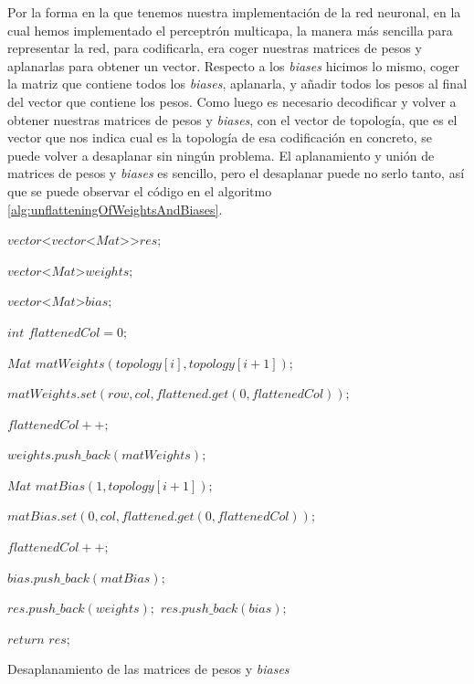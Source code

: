 Por la forma en la que tenemos nuestra implementación de la red neuronal, en la cual hemos implementado el perceptrón multicapa, la manera más sencilla para representar la red, para codificarla, era coger nuestras matrices de pesos y aplanarlas para obtener un vector. Respecto a los \textit{biases} hicimos lo mismo, coger la matriz que contiene todos los \textit{biases}, aplanarla, y añadir todos los pesos al final del vector que contiene los pesos. Como luego es necesario decodificar y volver a obtener nuestras matrices de pesos y \textit{biases}, con el vector de topología, que es el vector que nos indica cual es la topología de esa codificación en concreto, se puede volver a desaplanar sin ningún problema. El aplanamiento y unión de matrices de pesos y \textit{biases} es sencillo, pero el desaplanar puede no serlo tanto, así que se puede observar el código en el algoritmo \ref{alg:unflatteningOfWeightsAndBiases}.

\vspace{2mm}
\begin{algorithm}[H]
    $vector$\textless $vector$\textless $Mat$\textgreater\textgreater $res;$
    
    $vector$\textless $Mat$\textgreater $weights;$
    
    $vector$\textless $Mat$\textgreater $bias;$
    
    $int$ $flattenedCol = 0;$
    
    {
        $Mat$ $matWeights(topology[i], topology[i + 1]);$

        {
            {
                $matWeights.set(row, col, flattened.get(0, flattenedCol));$

                $flattenedCol++;$
            }
        }

        $weights.push\_back(matWeights);$
    }
    {
        $Mat$ $matBias(1, topology[i + 1]);$

        {
            $matBias.set(0, col, flattened.get(0, flattenedCol));$

            $flattenedCol++;$
        }

        $bias.push\_back(matBias);$
    }

    $res.push\_back(weights);$
    $res.push\_back(bias);$

    $return$ $res;$
    
	\caption{Desaplanamiento de las matrices de pesos y \textit{biases}}
	\label{alg:unflatteningOfWeightsAndBiases}
\end{algorithm}
\vspace{2mm}

